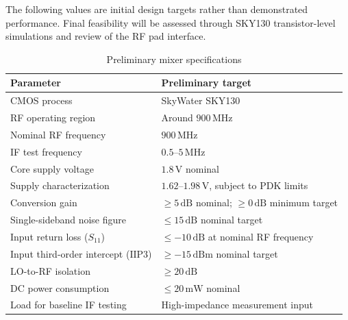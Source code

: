\documentclass[11pt,letterpaper]{article}
\begin{document}
The following values are initial design targets rather
than demonstrated performance. Final feasibility will be
assessed through SKY130 transistor-level simulations and
review of the RF pad interface.

\begin{table}[htbp]
\centering
\caption{Preliminary mixer specifications}
\label{tab:specifications}
\begin{tabularx}{\textwidth}{@{}p{}Y@{}}
\toprule
\textbf{Parameter} & \textbf{Preliminary target} \\
\midrule

CMOS process &
SkyWater SKY130 \\

RF operating region &
Around \(900\,\mathrm{MHz}\) \\

Nominal RF frequency &
\(900\,\mathrm{MHz}\) \\

IF test frequency &
\(0.5\)--\(5\,\mathrm{MHz}\) \\

Core supply voltage &
\(1.8\,\mathrm{V}\) nominal \\

Supply characterization &
\(1.62\)--\(1.98\,\mathrm{V}\),
subject to PDK limits \\

Conversion gain &
\(\geq 5\,\mathrm{dB}\) nominal;
\(\geq 0\,\mathrm{dB}\) minimum target \\

Single-sideband noise figure &
\(\leq 15\,\mathrm{dB}\) nominal target \\

Input return loss (\(S_{11}\)) &
\(\leq -10\,\mathrm{dB}\)
at nominal RF frequency \\

Input third-order intercept (\(\mathrm{IIP3}\)) &
\(\geq -15\,\mathrm{dBm}\) nominal target \\

LO-to-RF isolation &
\(\geq 20\,\mathrm{dB}\) \\

DC power consumption &
\(\leq 20\,\mathrm{mW}\) nominal \\

Load for baseline IF testing &
High-impedance measurement input \\

\bottomrule
\end{tabularx}
\end{table}
\end{document}
